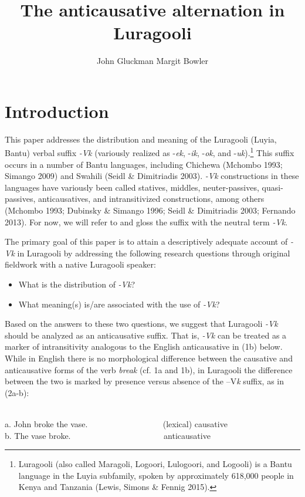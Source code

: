 \documentclass[output=paper]{langsci/langscibook}
\title{The anticausative alternation in Luragooli}
\author{%
 John Gluckman\affiliation{UCLA}\lastand 
 Margit Bowler \affiliation{UCLA}
}
\begin{document}
\section{Introduction}

This paper addresses the distribution and meaning of the Luragooli (Luyia, Bantu) verbal suffix \textit{-Vk} (variously realized as -\textit{ek}, -\textit{ik}, -\textit{ok}, and -\textit{uk}).\footnote{ Luragooli (also called Maragoli, Logoori, Lulogoori, and Logooli) is a Bantu language in the Luyia subfamily, spoken by approximately 618,000 people in Kenya and Tanzania (Lewis, Simons \& Fennig 2015).} This suffix occurs in a number of Bantu languages, including Chichewa (Mchombo 1993; Simango 2009) and Swahili (Seidl \& Dimitriadis 2003). \textit{-Vk} constructions in these languages have variously been called statives, middles, neuter-passives, quasi-passives, anticausatives, and intransitivized constructions, among others (Mchombo 1993; Dubinsky \& Simango 1996; Seidl \& Dimitriadis 2003; Fernando 2013). For now, we will refer to and gloss the suffix with the neutral term \textit{-Vk}.

The primary goal of this paper is to attain a descriptively adequate account of \textit{-Vk} in Luragooli by addressing the following research questions through original fieldwork with a native Luragooli speaker:

\begin{itemize}
\item What is the distribution of \textit{-Vk}?
\item What meaning(s) is/are associated with the use of \textit{-Vk}?
\end{itemize}

Based on the answers to these two questions, we suggest that Luragooli \textit{-Vk }should be analyzed as an anticausative suffix. That is, \textit{-Vk} can be treated as a marker of intransitivity analogous to the English anticausative in (1b) below. While in English there is no morphological difference between the causative and anticausative forms of the verb \textit{break }(cf. 1a and 1b), in Luragooli the difference between the two is marked by presence versus absence of the –V\textit{k }suffix, as in (2a-b):


\ea\label{exx:}
\ea
{}\\
 a.  John broke the vase.~~~ ~~~ ~~~ ~~~ ~~~       (lexical) causative \\
 b.  The vase broke. ~~~ ~~~ ~~~ ~~~ ~~~ ~~~       anticausative \\
 \z
\z
\end{document}
